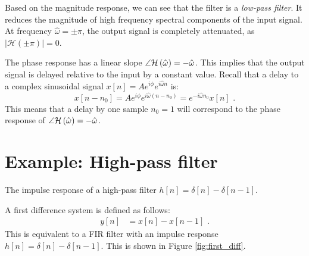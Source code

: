 Based on the magnitude response, we can see that the filter is
a \emph{low-pass filter}. It reduces the magnitude of high frequency
spectral components of the input signal. At frequency
$\hat{\omega}=\pm\pi$, the output signal is completely attenuated, as
$|\mathcal{H}(\pm \pi)|=0$.

The phase response has a linear slope $\angle \mathcal{H}\left(\hat{\omega}\right) =
-\hat{\omega}$. This implies that the output signal is delayed
relative to the input by a constant value. Recall that a delay to a
complex sinusoidal signal $x[n]=A e^{i\phi} e^{i\hat{\omega}n} $ is:
\begin{equation}
x[n-n_0] = A e^{i\phi} e^{i\hat{\omega} (n-n_0)} = e^{-i\hat{\omega}n_0}x[n] \,\,.
\end{equation}
This means that a delay by one sample $n_0=1$ will correspond to the phase
response of $\angle \mathcal{H}\left(\hat{\omega}\right) = -\hat{\omega}$.


\section{Example: High-pass filter}
\begin{marginfigure}
\begin{center}
\end{center}
\caption{The impulse response of a high-pass filter $h[n]=\delta[n]-\delta[n-1]$.}
\label{fig:first_diff}
\end{marginfigure}

A first difference system is defined as follows:
\begin{align}
y[n] & = x[n] - x[n-1] \,\,.
\end{align}
This is equivalent to a FIR filter with an impulse response $h[n]=\delta[n]-\delta[n-1]$. This is shown in Figure \ref{fig:first_diff}.

